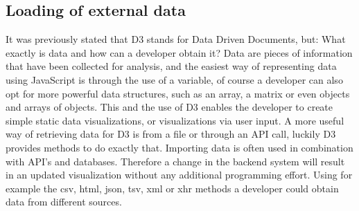 \documentclass{bioinfo}
\begin{document}
\subsection{Loading of external data}
It was previously stated that D3 stands for Data Driven Documents, but: What exactly is data and how can a developer obtain it? Data are pieces of information that have been collected for analysis,  and the easiest way of representing data using JavaScript is through the use of a variable, of course a developer can also opt for more powerful data structures, such as an array, a matrix or even objects and arrays of objects. This and the use of D3 enables the developer to create simple static data visualizations, or visualizations via user input. A more useful way of retrieving  data for D3 is from a file or through an API call, luckily D3 provides methods to do exactly that.
Importing data is often used in combination with API's and databases. Therefore a change in the backend system will result in an updated visualization without any additional programming effort.
Using for example the csv, html, json, tsv, xml or xhr methods a developer could obtain data from different sources.
\end{document}
